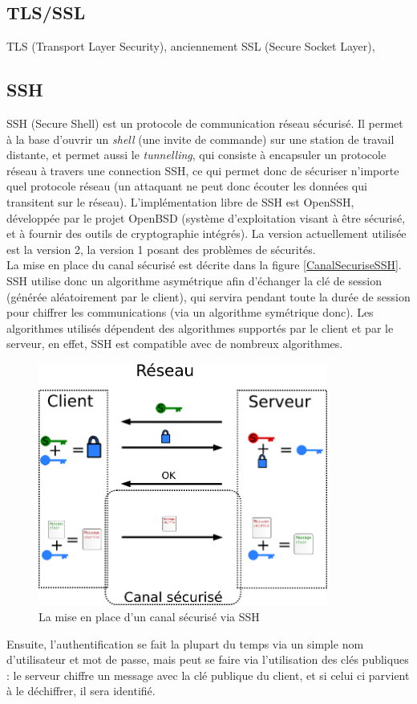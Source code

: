 \subsection{TLS/SSL}
TLS (Transport Layer Security), anciennement SSL (Secure Socket
Layer),
 
\subsection{SSH}
SSH (Secure Shell) est un protocole de communication réseau
sécurisé. Il permet à la base d'ouvrir un \emph{shell} (une invite
de commande) sur une station de travail distante, et permet aussi
le \emph{tunnelling}, qui consiste à encapsuler un protocole
réseau à travers une connection SSH, ce qui permet donc de
sécuriser n'importe quel protocole réseau (un attaquant ne peut
donc écouter les données qui transitent sur le réseau).
L'implémentation libre de SSH est OpenSSH, développée par le
projet OpenBSD (système d'exploitation visant à être sécurisé, et
à fournir des outils de cryptographie intégrés). La version
actuellement utilisée est la version 2, la version 1 posant des
problèmes de sécurités.
\\

La mise en place du canal sécurisé est décrite dans la figure
\ref{CanalSecuriseSSH}. SSH utilise donc un algorithme asymétrique
afin d'échanger la clé de session (générée aléatoirement par le
client), qui servira pendant toute la
durée de session pour chiffrer les communications (via un
algorithme symétrique donc). Les algorithmes utilisés dépendent
des algorithmes supportés par le client et par le serveur, en
effet, SSH est compatible avec de nombreux algorithmes.

 
\begin{figure}[h]
  \centering
    \label{fig:CanalSecuriseSSH}\includegraphics[width=0.85\textwidth]{images/SSH.png}
    \caption{La mise en place d'un canal sécurisé via SSH}
\end{figure}

Ensuite, l'authentification se fait la plupart du temps via un
simple nom d'utilisateur et mot de passe, mais peut se faire via
l'utilisation des clés publiques : le serveur chiffre un message 
avec la clé
publique du client, et si celui ci parvient à le déchiffrer, il
sera identifié.
